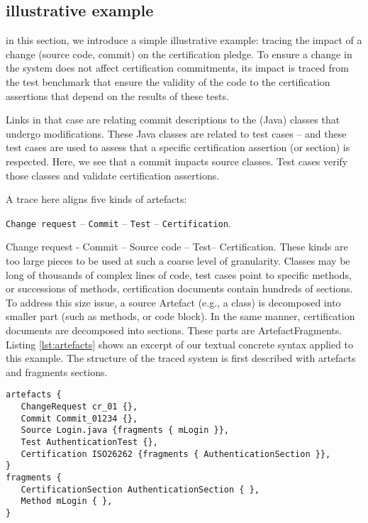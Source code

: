 

\subsection{illustrative example}
in this section, we introduce a simple illustrative example: tracing the impact of a change (source code, commit) on the certification pledge. To ensure a change in the system does not affect certification commitments, its impact is traced from the test benchmark that ensure the validity of the code to the certification assertions that depend on the results of these tests.

Links in that case are relating commit descriptions to the (Java) classes that undergo modifications. These Java classes are related to test cases – and these test cases are used to assess that a specific certification assertion (or section) is respected. Here, we see that a commit impacts source classes. Test cases verify those classes and validate certification assertions. 


A trace here aligns five kinds of artefacts: 

\footnotesize\verb"Change request" -- \verb"Commit" -- \verb"Test" --  \verb"Certification".
\normalsize

Change request - Commit – Source code – Test– Certification.
These kinds are too large pieces to be used at such a coarse level of granularity. Classes may be long of thousands of complex lines of code, test cases point to specific methods, or successions of methods, certification documents contain hundreds of sections. To address this size issue, a source Artefact (e.g., a class) is decomposed into smaller part (such as methods, or code block). In the same manner, certification documents are decomposed into sections. These parts are ArtefactFragments. Listing \ref{lst:artefacts} shows an excerpt of our textual concrete syntax applied to this example. The structure of the traced system is first described with artefacts and fragments sections.

\lstset{style=mystyle}
\begin{lstlisting}[caption=Artefacts and fragments,label=lst:artefacts]
artefacts {
   ChangeRequest cr_01 {},
   Commit Commit_01234 {},
   Source Login.java {fragments { mLogin }},
   Test AuthenticationTest {},
   Certification ISO26262 {fragments { AuthenticationSection }},
}
fragments {
   CertificationSection AuthenticationSection { },
   Method mLogin { },
}
\end{lstlisting}

